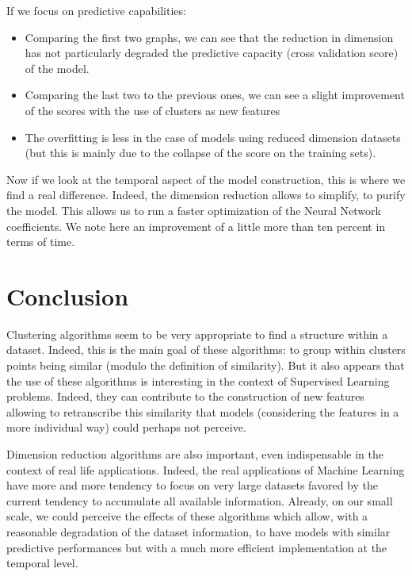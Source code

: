 \documentclass[15pt]{article}
\begin{document}
\begin{multicols}{2}
If we focus on predictive capabilities:
\begin{itemize}
\item Comparing the first two graphs, we can see that the reduction in dimension has not particularly degraded the predictive capacity (cross validation score) of the model.
\item Comparing the last two to the previous ones, we can see a slight improvement of the scores with the use of clusters as new features
\item The overfitting is less in the case of models using reduced dimension datasets (but this is mainly due to the collapse of the score on the training sets).
\end{itemize}
Now if we look at the temporal aspect of the model construction, this is where we find a real difference. Indeed, the dimension reduction allows to simplify, to purify the model. This allows us to run a faster optimization of the Neural Network coefficients. We note here an improvement of a little more than ten percent in terms of time. 

\section{Conclusion}

Clustering algorithms seem to be very appropriate to find a structure within a dataset. Indeed, this is the main goal of these algorithms: to group within clusters points being similar (modulo the definition of similarity). But it also appears that the use of these algorithms is interesting in the context of Supervised Learning problems. Indeed, they can contribute to the construction of new features allowing to retranscribe this similarity that models (considering the features in a more individual way) could perhaps not perceive.

Dimension reduction algorithms are also important, even indispensable in the context of real life applications. Indeed, the real applications of Machine Learning have more and more tendency to focus on very large datasets favored by the current tendency to accumulate all available information. Already, on our small scale, we could perceive the effects of these algorithms which allow, with a reasonable degradation of the dataset information, to have models with similar predictive performances but with a much more efficient implementation at the temporal level.

\end{multicols}
\end{document}
